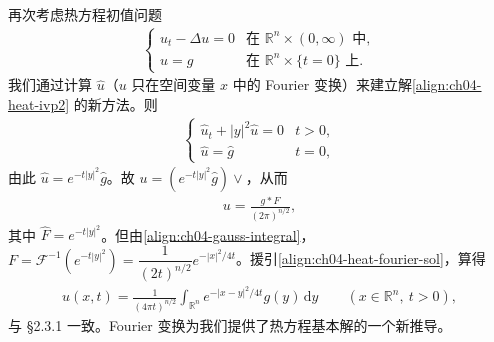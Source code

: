 \documentclass[../../main.tex]{subfiles}
\begin{document}
\begin{example}[热方程的基本解]\label{example:ch04-heat-fourier}再次考虑热方程初值问题
\begin{align}\label{align:ch04-heat-ivp2}
\begin{cases}
u_t-\Delta u=0 & \text{在 }\mathbb{R}^n\times(0,\infty)\text{ 中},\\
u=g & \text{在 }\mathbb{R}^n\times\{t=0\}\text{ 上}.
\end{cases}
\end{align}
我们通过计算 $\widehat{u}$（$u$ 只在空间变量 $x$ 中的 Fourier 变换）来建立解\eqref{align:ch04-heat-ivp2} 的新方法。则
\begin{align*}
\begin{cases}
\widehat{u}_t+|y|^2\widehat{u}=0 & t>0,\\
\widehat{u}=\widehat{g} & t=0,
\end{cases}
\end{align*}
由此 $\widehat{u}=e^{-t|y|^2}\widehat{g}$。故 $u=(e^{-t|y|^2}\widehat{g})\vee$，从而
\begin{align}\label{align:ch04-heat-fourier-sol}
u=\frac{g*F}{(2\pi)^{n/2}},
\end{align}
其中 $\widehat{F}=e^{-t|y|^2}$。但由\eqref{align:ch04-gauss-integral}，$F=\mathcal{F}^{-1}(e^{-t|y|^2})=\dfrac{1}{(2t)^{n/2}}e^{-|x|^2/4t}$。援引\eqref{align:ch04-heat-fourier-sol}，算得
\begin{align}\label{align:ch04-heat-fourier-formula}
u(x,t)=\frac{1}{(4\pi t)^{n/2}}\int_{\mathbb{R}^n}e^{-|x-y|^2/4t}g(y)\,\mathrm{d}y \qquad(x\in\mathbb{R}^n,\ t>0),
\end{align}
与 \S2.3.1 一致。Fourier 变换为我们提供了热方程基本解的一个新推导。
\end{example}
\end{document}
